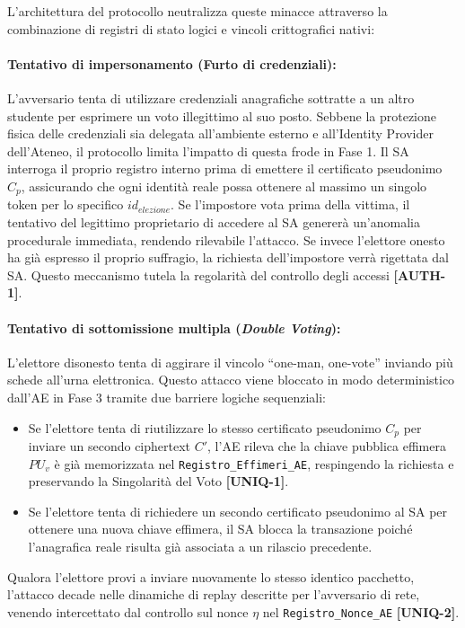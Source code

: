 L'architettura del protocollo neutralizza queste minacce attraverso la combinazione di registri di stato logici e vincoli crittografici nativi:

\paragraph{Tentativo di impersonamento (Furto di credenziali):} L'avversario tenta di utilizzare credenziali anagrafiche sottratte a un altro studente per esprimere un voto illegittimo al suo posto. Sebbene la protezione fisica delle credenziali sia delegata all'ambiente esterno e all'Identity Provider dell'Ateneo, il protocollo limita l'impatto di questa frode in Fase 1. Il SA interroga il proprio registro interno prima di emettere il certificato pseudonimo $C_p$, assicurando che ogni identità reale possa ottenere al massimo un singolo token per lo specifico $id_{elezione}$. Se l'impostore vota prima della vittima, il tentativo del legittimo proprietario di accedere al SA genererà un'anomalia procedurale immediata, rendendo rilevabile l'attacco. Se invece l'elettore onesto ha già espresso il proprio suffragio, la richiesta dell'impostore verrà rigettata dal SA. Questo meccanismo tutela la regolarità del controllo degli accessi \textbf{[AUTH-1]}.

\paragraph{Tentativo di sottomissione multipla (\textit{Double Voting}):} L'elettore disonesto tenta di aggirare il vincolo ``one-man, one-vote'' inviando più schede all'urna elettronica. Questo attacco viene bloccato in modo deterministico dall'AE in Fase 3 tramite due barriere logiche sequenziali:
\begin{itemize}
    \item Se l'elettore tenta di riutilizzare lo stesso certificato pseudonimo $C_p$ per inviare un secondo ciphertext $C'$, l'AE rileva che la chiave pubblica effimera $PU_v$ è già memorizzata nel \texttt{Registro\_Effimeri\_AE}, respingendo la richiesta e preservando la Singolarità del Voto \textbf{[UNIQ-1]}.
    \item Se l'elettore tenta di richiedere un secondo certificato pseudonimo al SA per ottenere una nuova chiave effimera, il SA blocca la transazione poiché l'anagrafica reale risulta già associata a un rilascio precedente.
\end{itemize}
Qualora l'elettore provi a inviare nuovamente lo stesso identico pacchetto, l'attacco decade nelle dinamiche di replay descritte per l'avversario di rete, venendo intercettato dal controllo sul nonce $\eta$ nel \texttt{Registro\_Nonce\_AE} \textbf{[UNIQ-2]}.

